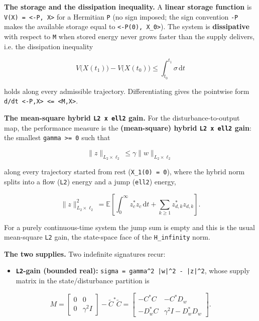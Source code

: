\documentclass[11pt,oneside]{report}
\newcommand{\code}[1]{\texttt{#1}}
\providecommand{\tightlist}{\setlength{\itemsep}{0pt}\setlength{\parskip}{0pt}}
\begin{document}
\textbf{The storage and the dissipation inequality.} A \textbf{linear storage function}
is \code{V(X) = \textless{}-P, X\textgreater{}} for a Hermitian \code{P} (no sign imposed; the sign convention
\code{-P} makes the available storage equal to \code{\textless{}-P(0), X\_0\textgreater{}}). The system is
\textbf{dissipative} with respect to \code{M} when stored energy never grows faster than
the supply delivers, i.e. the dissipation inequality

\[
V\big(X(t_1)\big) - V\big(X(t_0)\big)  \le  \int_{t_0}^{t_1} \sigma\,\mathrm{d}t
\]

holds along every admissible trajectory. Differentiating gives the pointwise
form \code{d/dt \textless{}-P,X\textgreater{} \textless{}= \textless{}M,X\textgreater{}}.

\textbf{The mean-square hybrid \code{L2 x ell2} gain.} For the disturbance-to-output map,
the performance measure is the \textbf{(mean-square) hybrid \code{L2 x ell2} gain}: the
smallest \code{gamma \textgreater{}= 0} such that

\[
\lVert z\rVert_{L_2\times\ell_2} \le \gamma \lVert w\rVert_{L_2\times\ell_2}
\]

along every trajectory started from rest (\code{X\_1(0) = 0}), where the hybrid norm
splits into a flow (\code{L2}) energy and a jump (\code{ell2}) energy,

\[
\lVert z\rVert^2_{L_2\times\ell_2}
   = \mathbb{E}\left[\int_0^\infty  z_c^{*}z_c\,\mathrm{d}t
     + \sum_{k\ge 1} z_{d,k}^{*}z_{d,k}\right].
\]

For a purely continuous-time system the jump sum is empty and this is the usual
mean-square \code{L2} gain, the state-space face of the \code{H\_infinity} norm.

\textbf{The two supplies.} Two indefinite signatures recur:

\begin{itemize}
\tightlist
\item
  \textbf{\code{L2}-gain (bounded real):} \code{sigma = gamma\^{}2 |w|\^{}2 - |z|\^{}2}, whose supply
  matrix in the state/disturbance partition is
\end{itemize}

\[
M = \begin{bmatrix} 0 & 0 \\ 0 & \gamma^2 I \end{bmatrix} - \widetilde C^{*}\widetilde C
  = \begin{bmatrix} -C^{*}C & -C^{*}D_w \\ -D_w^{*}C & \gamma^2 I - D_w^{*}D_w \end{bmatrix}.
\]
\end{document}
